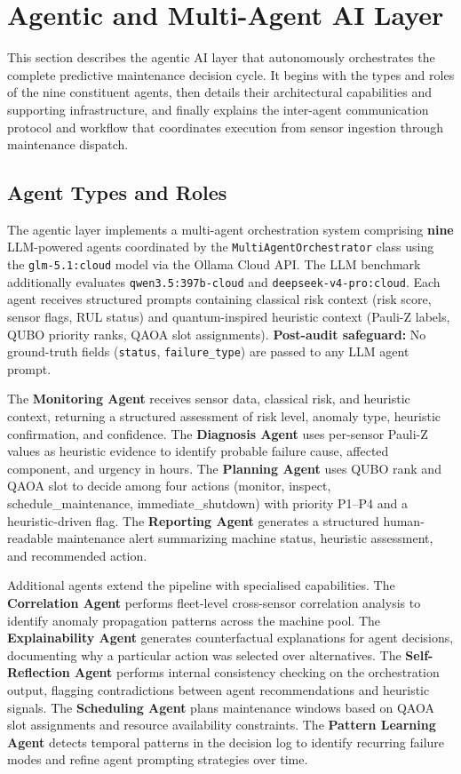 \section{Agentic and Multi-Agent AI Layer}

This section describes the agentic AI layer that autonomously orchestrates the complete predictive maintenance decision cycle. It begins with the types and roles of the nine constituent agents, then details their architectural capabilities and supporting infrastructure, and finally explains the inter-agent communication protocol and workflow that coordinates execution from sensor ingestion through maintenance dispatch.

\subsection{Agent Types and Roles}

The agentic layer implements a multi-agent orchestration system comprising \textbf{nine} LLM-powered agents coordinated by the \texttt{MultiAgentOrchestrator} class using the \texttt{glm-5.1:cloud} model via the Ollama Cloud API. The LLM benchmark additionally evaluates \texttt{qwen3.5:397b-cloud} and \texttt{deepseek-v4-pro:cloud}. Each agent receives structured prompts containing classical risk context (risk score, sensor flags, RUL status) and quantum-inspired heuristic context (Pauli-Z labels, QUBO priority ranks, QAOA slot assignments). \textbf{Post-audit safeguard:} No ground-truth fields (\texttt{status}, \texttt{failure\_type}) are passed to any LLM agent prompt.

The \textbf{Monitoring Agent} receives sensor data, classical risk, and heuristic context, returning a structured assessment of risk level, anomaly type, heuristic confirmation, and confidence. The \textbf{Diagnosis Agent} uses per-sensor Pauli-Z values as heuristic evidence to identify probable failure cause, affected component, and urgency in hours. The \textbf{Planning Agent} uses QUBO rank and QAOA slot to decide among four actions (monitor, inspect, schedule\_maintenance, immediate\_shutdown) with priority P1--P4 and a heuristic-driven flag. The \textbf{Reporting Agent} generates a structured human-readable maintenance alert summarizing machine status, heuristic assessment, and recommended action.

Additional agents extend the pipeline with specialised capabilities. The \textbf{Correlation Agent} performs fleet-level cross-sensor correlation analysis to identify anomaly propagation patterns across the machine pool. The \textbf{Explainability Agent} generates counterfactual explanations for agent decisions, documenting why a particular action was selected over alternatives. The \textbf{Self-Reflection Agent} performs internal consistency checking on the orchestration output, flagging contradictions between agent recommendations and heuristic signals. The \textbf{Scheduling Agent} plans maintenance windows based on QAOA slot assignments and resource availability constraints. The \textbf{Pattern Learning Agent} detects temporal patterns in the decision log to identify recurring failure modes and refine agent prompting strategies over time.

